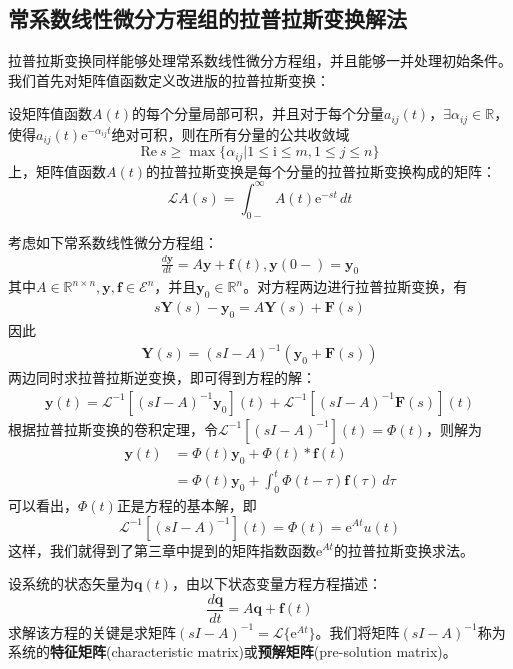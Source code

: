 \documentclass{ctexbook}
\begin{document}
\subsection{常系数线性微分方程组的拉普拉斯变换解法}\label{sub:laplace_ode_system}

拉普拉斯变换同样能够处理常系数线性微分方程组，并且能够一并处理初始条件。我们首先对矩阵值函数定义改进版的拉普拉斯变换：
\begin{definition}[矩阵值函数的拉普拉斯变换]
    设矩阵值函数$A(t)$的每个分量局部可积，并且对于每个分量$a_{ij}(t)$，$\exists \alpha_{ij}\in\mathbb{R}$，使得$a_{ij}(t)\mathrm{e}^{-\alpha_{ij} t}$绝对可积，则在所有分量的公共收敛域
    $$\text{Re}\ s\geq \max\{\alpha_{ij}|1\leq \mathrm{i}\leq m,1\leq j\leq n\}$$上，矩阵值函数$A(t)$的拉普拉斯变换是每个分量的拉普拉斯变换构成的矩阵：
    \[\mathcal{L} A(s)=\int_{0-}^{\infty}A(t)\mathrm{e}^{-st}\,dt\]
\end{definition}

考虑如下常系数线性微分方程组：
\begin{align*}
    \frac{d\mathbf{y}}{dt}=A\mathbf{y}+\mathbf{f}(t),\mathbf{y}(0-)=\mathbf{y}_0
\end{align*}
其中$A\in\mathbb{R} ^{n\times n},\mathbf{y},\mathbf{f}\in\mathcal{E} ^n$，并且$\mathbf{y}_0\in\mathbb{R} ^n$。对方程两边进行拉普拉斯变换，有
\begin{align*}
    s\mathbf{Y}(s)-\mathbf{y}_0=A\mathbf{Y}(s)+\mathbf{F}(s)
\end{align*}
因此
\begin{align*}
    \mathbf{Y}(s)=(sI-A)^{-1}(\mathbf{y}_0+\mathbf{F}(s))
\end{align*}
两边同时求拉普拉斯逆变换，即可得到方程的解：\begin{align*}
    \mathbf{y}(t)=\mathcal{L} ^{-1} \left[(sI-A)^{-1}\mathbf{y}_0\right](t)+\mathcal{L} ^{-1} \left[(sI-A)^{-1}\mathbf{F}(s)\right](t)
\end{align*}
根据拉普拉斯变换的卷积定理，令$\mathcal{L} ^{-1} \left[(sI-A)^{-1}\right](t)=\Phi(t)$，则解为\begin{align*}
    \mathbf{y}(t)&=\Phi(t)\mathbf{y}_0+\Phi(t)*\mathbf{f}(t)\\
    &=\Phi(t)\mathbf{y}_0+\int_0^{t}\Phi(t-\tau)\mathbf{f}(\tau)\,d\tau
\end{align*}
可以看出，$\Phi(t)$正是方程的基本解，即
$$\mathcal{L}^{-1} \left[(sI-A)^{-1}\right](t)=\Phi(t)=\mathrm{e}^{At}u(t)$$
这样，我们就得到了第三章中提到的矩阵指数函数$\mathrm{e}^{At}$的拉普拉斯变换求法。

\begin{definition}
    设系统的状态矢量为$\mathbf{q}(t)$，由以下状态变量方程方程描述：
    $$\frac{d\mathbf{q}}{dt}=A\mathbf{q}+\mathbf{f}(t)$$
    求解该方程的关键是求矩阵$(sI-A)^{-1}=\mathcal{L}\{\mathrm{e}^{At}\}$。我们将矩阵$(sI-A)^{-1}$称为系统的\textbf{特征矩阵}(characteristic matrix)或\textbf{预解矩阵}(pre-solution matrix)。
\end{definition}
\end{document}
